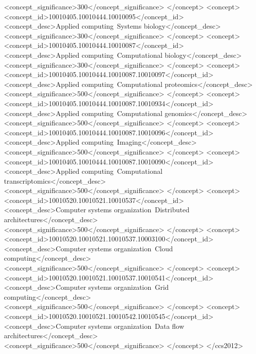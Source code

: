 \documentclass[sigconf,authordraft]{acmart}
\begin{document}
\begin{CCSXML}
       <concept_significance>300</concept_significance>
       </concept>
   <concept>
       <concept_id>10010405.10010444.10010095</concept_id>
       <concept_desc>Applied computing~Systems biology</concept_desc>
       <concept_significance>300</concept_significance>
       </concept>
   <concept>
       <concept_id>10010405.10010444.10010087</concept_id>
       <concept_desc>Applied computing~Computational biology</concept_desc>
       <concept_significance>300</concept_significance>
       </concept>
   <concept>
       <concept_id>10010405.10010444.10010087.10010097</concept_id>
       <concept_desc>Applied computing~Computational proteomics</concept_desc>
       <concept_significance>500</concept_significance>
       </concept>
   <concept>
       <concept_id>10010405.10010444.10010087.10010934</concept_id>
       <concept_desc>Applied computing~Computational genomics</concept_desc>
       <concept_significance>500</concept_significance>
       </concept>
   <concept>
       <concept_id>10010405.10010444.10010087.10010096</concept_id>
       <concept_desc>Applied computing~Imaging</concept_desc>
       <concept_significance>500</concept_significance>
       </concept>
   <concept>
       <concept_id>10010405.10010444.10010087.10010090</concept_id>
       <concept_desc>Applied computing~Computational transcriptomics</concept_desc>
       <concept_significance>500</concept_significance>
       </concept>
   <concept>
       <concept_id>10010520.10010521.10010537</concept_id>
       <concept_desc>Computer systems organization~Distributed architectures</concept_desc>
       <concept_significance>500</concept_significance>
       </concept>
   <concept>
       <concept_id>10010520.10010521.10010537.10003100</concept_id>
       <concept_desc>Computer systems organization~Cloud computing</concept_desc>
       <concept_significance>500</concept_significance>
       </concept>
   <concept>
       <concept_id>10010520.10010521.10010537.10010541</concept_id>
       <concept_desc>Computer systems organization~Grid computing</concept_desc>
       <concept_significance>500</concept_significance>
       </concept>
   <concept>
       <concept_id>10010520.10010521.10010542.10010545</concept_id>
       <concept_desc>Computer systems organization~Data flow architectures</concept_desc>
       <concept_significance>500</concept_significance>
       </concept>
 </ccs2012>
\end{CCSXML}
\end{document}
